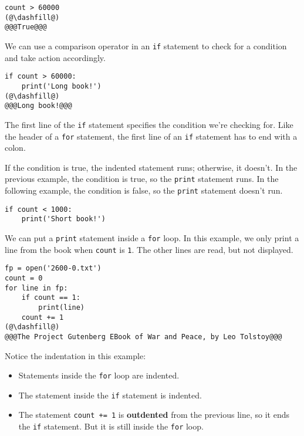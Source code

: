 \begin{lstlisting}[]
count > 60000
(@\dashfill@)
@@@True@@@
\end{lstlisting}

We can use a comparison operator in an \passthrough{\lstinline!if!}
statement to check for a condition and take action accordingly.

\begin{lstlisting}[]
if count > 60000:
    print('Long book!')
(@\dashfill@)
@@@Long book!@@@
\end{lstlisting}

The first line of the \passthrough{\lstinline!if!} statement specifies
the condition we're checking for. Like the header of a
\passthrough{\lstinline!for!} statement, the first line of an
\passthrough{\lstinline!if!} statement has to end with a colon.

If the condition is true, the indented statement runs; otherwise, it
doesn't. In the previous example, the condition is true, so the
\passthrough{\lstinline!print!} statement runs. In the following
example, the condition is false, so the \passthrough{\lstinline!print!}
statement doesn't run.

\begin{lstlisting}[]
if count < 1000:
    print('Short book!')
\end{lstlisting}

We can put a \passthrough{\lstinline!print!} statement inside a
\passthrough{\lstinline!for!} loop. In this example, we only print a
line from the book when \passthrough{\lstinline!count!} is
\passthrough{\lstinline!1!}. The other lines are read, but not
displayed.

\begin{lstlisting}[]
fp = open('2600-0.txt')
count = 0
for line in fp:
    if count == 1:
        print(line)
    count += 1
(@\dashfill@)
@@@The Project Gutenberg EBook of War and Peace, by Leo Tolstoy@@@
\end{lstlisting}

Notice the indentation in this example:

\begin{itemize}
\item
  Statements inside the \passthrough{\lstinline!for!} loop are indented.
\item
  The statement inside the \passthrough{\lstinline!if!} statement is
  indented.
\item
  The statement \passthrough{\lstinline!count += 1!} is
  \textbf{outdented} from the previous line, so it ends the
  \passthrough{\lstinline!if!} statement. But it is still inside the
  \passthrough{\lstinline!for!} loop.
\end{itemize}

